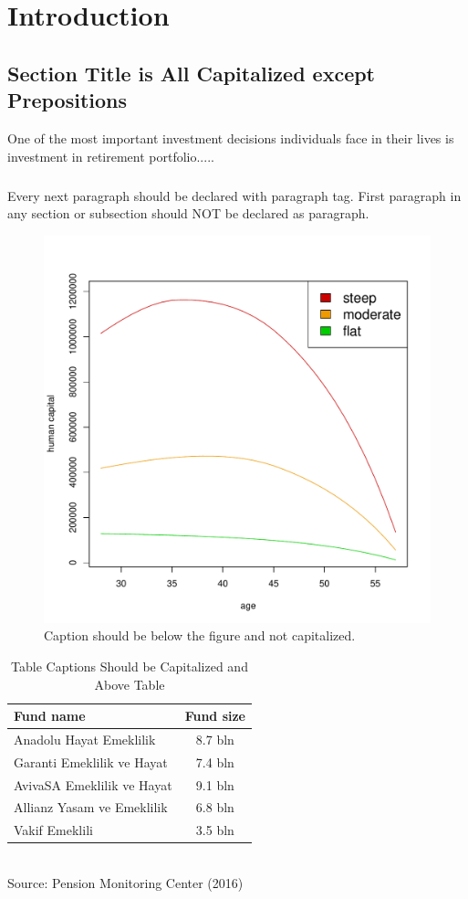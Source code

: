 \chapter{Introduction} %
\label{intro} %


\section{Section Title is All Capitalized except Prepositions}
One of the most important investment decisions individuals face in their lives is investment in retirement portfolio.....
\paragraph*{}
Every next paragraph should be declared with paragraph tag. First paragraph in any section or subsection should NOT be declared as paragraph. 

\begin{figure}
    \centering
    \includegraphics[scale=0.5]{figs/humancapital.pdf}
    \caption{Caption should be below the figure and not capitalized.}
\end{figure}


\begin{table}
	\centering
	\caption{Table Captions Should be Capitalized and Above Table}
	\begin{tabular}[H]{lc}
		\hline
		Fund name&Fund size\\
		\hline
		Anadolu Hayat Emeklilik&8.7 bln\\
		Garanti Emeklilik ve Hayat&7.4 bln\\
		AvivaSA Emeklilik ve Hayat&9.1 bln\\
		Allianz Yasam ve Emeklilik&6.8 bln\\
		Vakif Emeklili&3.5 bln\\
		\hline
	\end{tabular}\\
	Source: Pension Monitoring Center (2016)
\end{table}